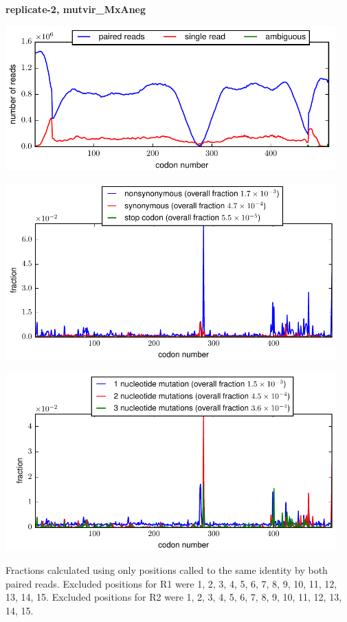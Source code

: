 \documentclass[10pt,letterpaper]{article}
\begin{document}
\centerline{\Large \bf replicate-2, mutvir\_MxAneg}
\vspace{0.1in}

\centerline{\includegraphics[width=5in]{replicate-2-mutvir_MxAneg_codondepth.pdf}}
\vspace{0.1in}

\centerline{\includegraphics[width=5in]{replicate-2-mutvir_MxAneg_syn-ns-dist.pdf}}
\vspace{0.1in}

\centerline{\includegraphics[width=5in]{replicate-2-mutvir_MxAneg_nmutspercodon-dist.pdf}}
\vspace{0.1in}

Fractions calculated using only positions called to the same identity by both paired reads.  Excluded positions for R1 were 1, 2, 3, 4, 5, 6, 7, 8, 9, 10, 11, 12, 13, 14, 15. 
 Excluded positions for R2 were 1, 2, 3, 4, 5, 6, 7, 8, 9, 10, 11, 12, 13, 14, 15. 
\end{document}
